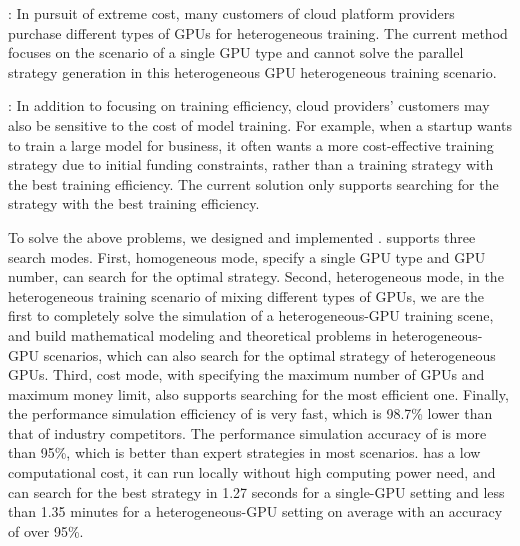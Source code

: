 :
In pursuit of extreme cost, many customers of cloud platform providers purchase different types of GPUs for heterogeneous training.
The current method focuses on the scenario of a single GPU type and cannot solve the parallel strategy generation in this heterogeneous GPU heterogeneous training scenario.

:
In addition to focusing on training efficiency, cloud providers' customers may also be sensitive to the cost of model training.
For example, when a startup wants to train a large model for business, it often wants a more cost-effective training strategy due to initial funding constraints, rather than a training strategy with the best training efficiency.
The current solution only supports searching for the strategy with the best training efficiency.


To solve the above problems, we designed and implemented \sysname. \sysname supports three search modes.
First, homogeneous mode, specify a single GPU type and GPU number, \sysname can search for the optimal strategy.
Second, heterogeneous mode, in the heterogeneous training scenario of mixing different types of GPUs, we are the first to completely solve the simulation of a heterogeneous-GPU training scene, and build mathematical modeling and theoretical problems in heterogeneous-GPU scenarios, which can also search for the optimal strategy of heterogeneous GPUs.
Third, cost mode, with specifying the maximum number of GPUs and maximum money limit, \sysname also supports searching for the most efficient one.
Finally, the performance simulation efficiency of \sysname is very fast, which is 98.7\% lower than that of industry competitors. The performance simulation accuracy of \sysname is more than 95\%, which is better than expert strategies in most scenarios. \sysname has a low computational cost, it can run locally without high computing power need, and can search for the best strategy in 1.27 seconds for a single-GPU setting and less than 1.35 minutes for a heterogeneous-GPU setting on average with an accuracy of over 95\%.



